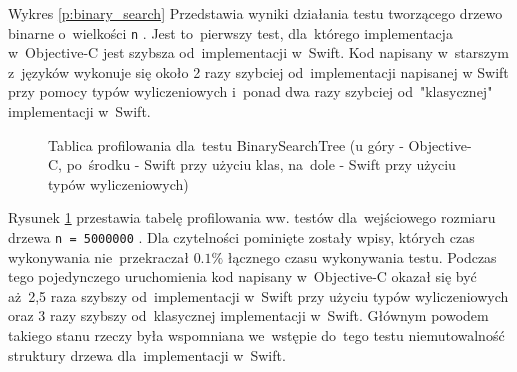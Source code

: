 \documentclass[mgr, shortabstract]{iithesis}
\newcommand{\swiftinline}[1]{
    \texttt{#1}
}
\begin{document}
Wykres \ref{p:binary_search} Przedstawia wyniki działania testu tworzącego drzewo binarne o~wielkości \swiftinline{n}. Jest to~pierwszy test, dla~którego implementacja w~Objective-C jest szybsza od~implementacji w~Swift. Kod napisany w~starszym z~języków wykonuje się około 2 razy szybciej od~implementacji napisanej w Swift przy pomocy typów wyliczeniowych i~ponad dwa razy szybciej od~"klasycznej" implementacji w~Swift. 

\begin{figure}
    \caption{Tablica profilowania dla~testu BinarySearchTree (u góry - Objective-C, po~środku - Swift przy użyciu klas, na~dole - Swift przy użyciu typów wyliczeniowych)}
    \label{i:binary_search}
\end{figure}

Rysunek \ref{i:binary_search} przestawia tabelę profilowania ww. testów dla~wejściowego rozmiaru drzewa \swiftinline{n = 5000000}. Dla czytelności pominięte zostały wpisy, których czas wykonywania nie~przekraczał $0.1\%$ łącznego czasu wykonywania testu. Podczas tego pojedynczego uruchomienia kod napisany w~Objective-C okazał się być aż~2,5 raza szybszy od~implementacji w~Swift przy użyciu typów wyliczeniowych oraz 3 razy szybszy od~klasycznej implementacji w~Swift. Głównym powodem takiego stanu rzeczy była wspomniana we~wstępie do~tego testu niemutowalność struktury drzewa dla~implementacji w~Swift. 
\end{document}
